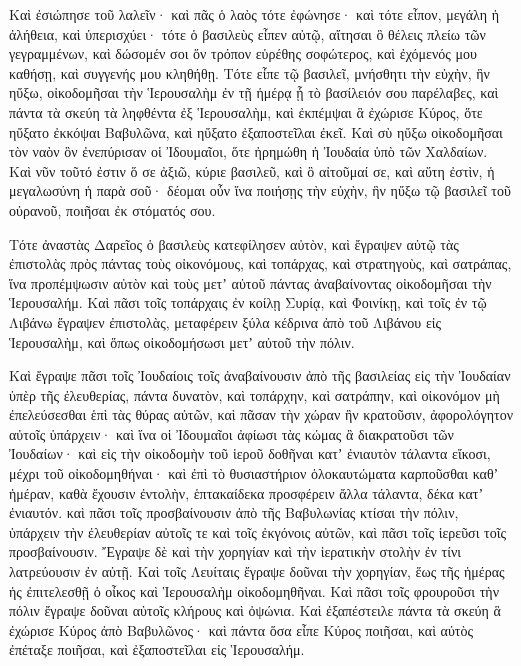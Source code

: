 {\par }{\PP {}Καὶ ἐσιώπησε τοῦ λαλεῖν· καὶ πᾶς ὁ λαὸς τότε ἐφώνησε· καὶ τότε εἶπον, μεγάλη ἡ ἀλήθεια, καὶ ὑπερισχύει·
τότε ὁ βασιλεὺς εἶπεν αὐτῷ, αἴτησαι ὃ θέλεις πλείω τῶν γεγραμμένων, καὶ δώσομέν σοι ὅν τρόπον εὑρέθης σοφώτερος, καὶ ἐχόμενός μου καθήσῃ, καὶ συγγενής μου κληθήθῃ.
Τότε εἶπε τῷ βασιλεῖ, μνήσθητι τὴν εὐχὴν, ἣν ηὔξω, οἰκοδομῆσαι τὴν Ἱερουσαλὴμ ἐν τῇ ἡμέρᾳ ᾗ τὸ βασίλειόν σου παρέλαβες,
καὶ πάντα τὰ σκεύη τὰ ληφθέντα ἐξ Ἱερουσαλὴμ, καὶ ἐκπέμψαι ἃ ἐχώρισε Κύρος, ὅτε ηὔξατο ἐκκόψαι Βαβυλῶνα, καὶ ηὔξατο ἐξαποστεῖλαι ἐκεῖ.
Καὶ σὺ ηὔξω οἰκοδομῆσαι τὸν ναὸν ὃν ἐνεπύρισαν οἱ Ἰδουμαῖοι, ὅτε ἠρημώθη ἡ Ἰουδαία ὑπὸ τῶν Χαλδαίων.
Καὶ νῦν τοῦτό ἐστιν ὅ σε ἀξιῶ, κύριε βασιλεῦ, καὶ ὃ αἰτοῦμαί σε, καὶ αὕτη ἐστὶν, ἡ μεγαλωσύνη ἡ παρὰ σοῦ· δέομαι οὖν ἵνα ποιήσῃς τὴν εὐχὴν, ἣν ηὔξω τῷ βασιλεῖ τοῦ οὐρανοῦ, ποιῆσαι ἐκ στόματός σου.
\par }{\PP {}Τότε ἀναστὰς Δαρεῖος ὁ βασιλεὺς κατεφίλησεν αὐτὸν, καὶ ἔγραψεν αὐτῷ τὰς ἐπιστολὰς πρὸς πάντας τοὺς οἰκονόμους, καὶ τοπάρχας, καὶ στρατηγοὺς, καὶ σατράπας, ἵνα προπέμψωσιν αὐτὸν καὶ τοὺς μετʼ αὐτοῦ πάντας ἀναβαίνοντας οἰκοδομῆσαι τὴν Ἱερουσαλήμ.
Καὶ πᾶσι τοῖς τοπάρχαις ἐν κοίλῃ Συρίᾳ, καὶ Φοινίκῃ, καὶ τοῖς ἐν τῷ Λιβάνω ἔγραψεν ἐπιστολὰς, μεταφέρειν ξύλα κέδρινα ἀπὸ τοῦ Λιβάνου εἰς Ἱερουσαλὴμ, καὶ ὅπως οἰκοδομήσωσι μετʼ αὐτοῦ τὴν πόλιν.
\par }{\PP {}Καὶ ἔγραψε πᾶσι τοῖς Ἰουδαίοις τοῖς ἀναβαίνουσιν ἀπὸ τῆς βασιλείας εἰς τὴν Ἰουδαίαν ὑπὲρ τῆς ἐλευθερίας, πάντα δυνατὸν, καὶ τοπάρχην, καὶ σατράπην, καὶ οἰκονόμον μὴ ἐπελεύσεσθαι ἑπὶ τὰς θύρας αὐτῶν,
καὶ πᾶσαν τὴν χώραν ἣν κρατοῦσιν, ἀφορολόγητον αὐτοῖς ὑπάρχειν· καὶ ἵνα οἱ Ἰδουμαῖοι ἀφίωσι τὰς κώμας ἃ διακρατοῦσι τῶν Ἰουδαίων·
καὶ εἰς τὴν οἰκοδομὴν τοῦ ἱεροῦ δοθῆναι κατʼ ἐνιαυτὸν τάλαντα εἴκοσι, μέχρι τοῦ οἰκοδομηθήναι·
καὶ ἐπὶ τὸ θυσιαστήριον ὁλοκαυτώματα καρποῦσθαι καθʼ ἡμέραν, καθὰ ἔχουσιν ἐντολὴν, ἑπτακαίδεκα προσφέρειν ἄλλα τάλαντα, δέκα κατʼ ἐνιαυτόν.
καὶ πᾶσι τοῖς προσβαίνουσιν ἀπὸ τῆς Βαβυλωνίας κτίσαι τὴν πόλιν, ὑπάρχειν τὴν ἐλευθερίαν αὐτοῖς τε καὶ τοῖς ἐκγόνοις αὐτῶν, καὶ πᾶσι τοῖς ἱερεῦσι τοῖς προσβαίνουσιν.
Ἔγραψε δὲ καὶ τὴν χορηγίαν καὶ τὴν ἱερατικὴν στολὴν ἐν τίνι λατρεύουσιν ἐν αὐτῇ.
Καὶ τοῖς Λευίταις ἔγραψε δοῦναι τὴν χορηγίαν, ἕως τῆς ἡμέρας ἡς ἐπιτελεσθῇ ὁ οἶκος καὶ Ἱερουσαλὴμ οἰκοδομηθῆναι.
Καὶ πᾶσι τοῖς φρουροῦσι τὴν πόλιν ἔγραψε δοῦναι αὐτοῖς κλήρους καὶ ὀψώνια.
Καὶ ἐξαπέστειλε πάντα τὰ σκεύη ἃ ἐχώρισε Κύρος ἀπὸ Βαβυλῶνος· καὶ πάντα ὅσα εἶπε Κύρος ποιῆσαι, καὶ αὐτὸς ἐπέταξε ποιῆσαι, καὶ ἐξαποστεῖλαι εἰς Ἱερουσαλήμ.
}
